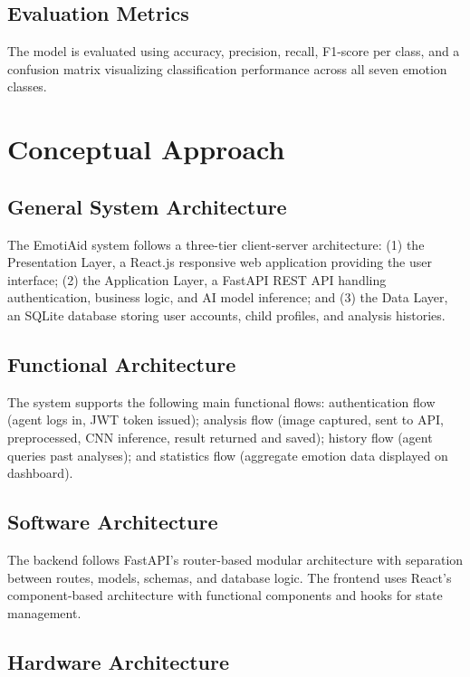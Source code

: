 \documentclass[a4paper,12pt,oneside]{report}
\begin{document}
\subsection{Evaluation Metrics}

The model is evaluated using accuracy, precision, recall, F1-score per class, and
a confusion matrix visualizing classification performance across all seven emotion
classes.

\section{Conceptual Approach}

\subsection{General System Architecture}

The EmotiAid system follows a three-tier client-server architecture: (1) the
Presentation Layer, a React.js responsive web application providing the user
interface; (2) the Application Layer, a FastAPI REST API handling authentication,
business logic, and AI model inference; and (3) the Data Layer, an SQLite database
storing user accounts, child profiles, and analysis histories.

\subsection{Functional Architecture}

The system supports the following main functional flows: authentication flow
(agent logs in, JWT token issued); analysis flow (image captured, sent to API,
preprocessed, CNN inference, result returned and saved); history flow (agent
queries past analyses); and statistics flow (aggregate emotion data displayed on
dashboard).

\subsection{Software Architecture}

The backend follows FastAPI's router-based modular architecture with separation
between routes, models, schemas, and database logic. The frontend uses React's
component-based architecture with functional components and hooks for state
management.

\subsection{Hardware Architecture}
\end{document}
